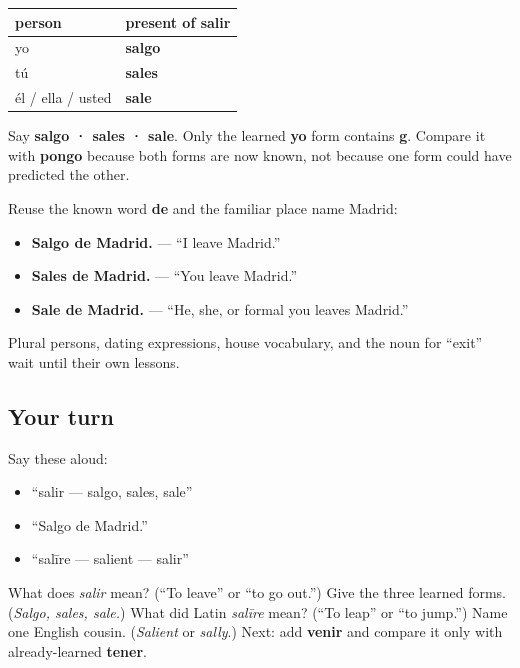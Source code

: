 \begin{grammarlens}[title={Grammar Lens: one more singular set}]
\noindent
\begin{tabularx}{\linewidth}{@{}>{\raggedright\arraybackslash}X>{\raggedright\arraybackslash}X@{}}
\toprule
\textbf{person} & \textbf{present of \textbf{salir}} \\
\midrule
yo & \textbf{salgo} \\
tú & \textbf{sales} \\
él / ella / usted & \textbf{sale} \\
\bottomrule
\end{tabularx}

Say \textbf{salgo · sales · sale}. Only the learned \textbf{yo} form contains \textbf{g}. Compare it with \textbf{pongo} because both forms are now known, not because one form could have predicted the other.

Reuse the known word \textbf{de} and the familiar place name Madrid:

\begin{itemize}
\raggedright
  \item \textbf{Salgo de Madrid.} — “I leave Madrid.”
  \item \textbf{Sales de Madrid.} — “You leave Madrid.”
  \item \textbf{Sale de Madrid.} — “He, she, or formal you leaves Madrid.”
\end{itemize}

Plural persons, dating expressions, house vocabulary, and the noun for “exit” wait until their own lessons.
\end{grammarlens}

\subsection*{Your turn}
Say these aloud:

\begin{itemize}
\raggedright
  \item “salir — salgo, sales, sale”
  \item “Salgo de Madrid.”
  \item “salīre — salient — salir”
\end{itemize}

\begin{tcolorbox}[breakable,colback=teal!4,colframe=teal!35!black,title={Before you move on}]
What does \emph{salir} mean? (“To leave” or “to go out.”) Give the three learned forms. (\emph{Salgo, sales, sale.}) What did Latin \emph{salīre} mean? (“To leap” or “to jump.”) Name one English cousin. (\emph{Salient} or \emph{sally}.) Next: add \textbf{venir} and compare it only with already-learned \textbf{tener}.
\end{tcolorbox}
